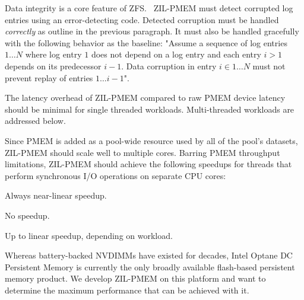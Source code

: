 \documentclass[12pt,a4paper,twoside]{book}
\begin{document}
Data integrity is a core feature of ZFS.~\cite{bonwickZettabyteFileSystem2003}
ZIL-PMEM must detect corrupted log entries using an error-detecting code.
Detected corruption must be handled \textit{correctly} as outline in the previous paragraph.
It must also be handled gracefully with the following behavior as the baseline:
"Assume a sequence of log entries $1 \dots N$ where log entry $1$ does not depend on a log entry and each entry $i > 1$ depends on its predecessor $i-1$.
Data corruption in entry $i \in 1 \dots N$ must not prevent replay of entries $1 \dots i-1$".

The latency overhead of ZIL-PMEM compared to raw PMEM device latency should be minimal for single threaded workloads.
Multi-threaded workloads are addressed below.

Since PMEM is added as a pool-wide resource used by all of the pool's datasets, ZIL-PMEM should scale well to multiple cores.
Barring PMEM throughput limitations, ZIL-PMEM should achieve the following speedups for threads that perform synchronous I/O operations on separate CPU cores:
{
\setlength{\parskip}{0pt}
\begin{description}[topsep=0pt, noitemsep, leftmargin=1cm, labelindent=1cm, widest=1 private dataset per thread]
    \item[1 private dataset per thread] Always near-linear speedup.
    \item[1 shared dataset] \mbox{}
          \begin{description}[noitemsep, leftmargin=1cm, labelindent=1cm, widest=ZPL filesystem]
              \item[ZPL filesystem] No speedup.
              \item[ZVOL] Up to linear speedup, depending on workload.
          \end{description}
\end{description}
}

Whereas battery-backed NVDIMMs have existed for decades, Intel Optane DC Persistent Memory is currently the only broadly available flash-based persistent memory product.
We develop ZIL-PMEM on this platform and want to determine the maximum performance that can be achieved with it.
\end{document}
